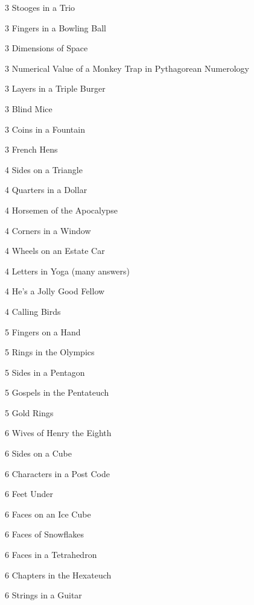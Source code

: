 \documentclass[10pt]{article}
\begin{document}
\begin{multicols}{4}
\begin{description}
    \item 3 \w S{tooges} in a \w T{rio}
    \item 3 \w F{ingers} in a \w B{owling} \w B{all}
    \item 3 \w D{imensions} of \w S{pace}
     \item 3 \w N{umerical} \w V{alue} of a \w M{onkey}  \w T{rap} in \w P{ythagorean} \w N{umerology}
    \item 3 \w L{ayers}  in a \w T{riple} \w B{urger}
    \item 3 \w B{lind} \w M{ice}
    \item 3 \w C{oins} in a \w F{ountain}
	\item 3 \w F{rench} \w H{ens}
    \item 4 \w S{ides} on a \w T{riangle}
    \item 4 \w Q{uarters} in a \w D{ollar}
    \item 4 \w H{orsemen} of the \w A{pocalypse}
    \item 4 \w C{orners} in a \w W{indow}
    \item 4 \w W{heels} on an \w E{state} \w C{ar}
     \item 4 \w L{etters}  in \w Y{oga} (many answers)
    \item 4 \w H{e's} a \w J{olly} \w G{ood} \w F{ellow}
	\item 4 \w C{alling} \w B{irds}
    \item 5 \w F{ingers} on a \w H{and}
    \item 5 \w R{ings} in the \w O{lympics}
    \item 5 \w S{ides} in a \w P{entagon}
    \item 5 \w G{ospels} in the \w P{entateuch}
	\item 5 \w G{old} \w R{ings}
    \item 6 \w W{ives} of \w H{enry} the \w E{ighth}
    \item 6 \w S{ides} on a \w C{ube}
    \item 6 \w C{haracters} in a \w P{ost} \w C{ode}
    \item 6 \w F{eet} \w U{nder}
    \item 6 \w F{aces} on an \w I{ce} \w C{ube}
    \item 6 \w F{aces} of \w S{nowflakes}
    \item 6 \w F{aces}  in a \w T{etrahedron}
    \item 6 \w C{hapters}  in the \w H{exateuch}
    \item 6 \w S{trings} in a \w G{uitar}

\end{description}
\end{multicols}
\end{document}
